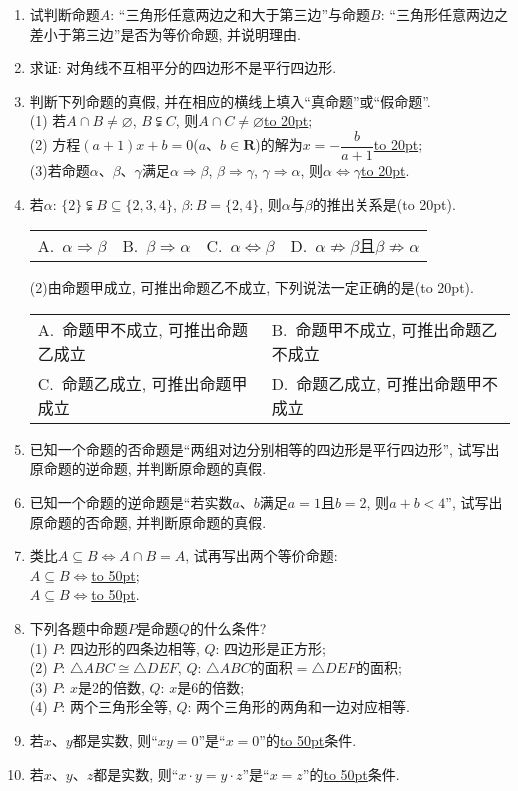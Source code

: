 \documentclass[10pt,a4paper]{article}
\newcommand{\blank}[1]{\underline{\hbox to #1pt{}}}
\newcommand{\bracket}[1]{(\hbox to #1pt{})}
\newcommand{\twoch}[4]{\par\begin{tabular}{p{.46\textwidth}p{.46\textwidth}}
A.~#1& B.~#2\\
C.~#3& D.~#4
\end{tabular}}
\newcommand{\fourch}[4]{\par\begin{tabular}{p{.23\textwidth}p{.23\textwidth}p{.23\textwidth}p{.23\textwidth}}
A.~#1 &B.~#2& C.~#3& D.~#4
\end{tabular}}
\begin{document}
\begin{enumerate}[1.]
\item 试判断命题$A$: ``三角形任意两边之和大于第三边''与命题$B$: ``三角形任意两边之差小于第三边''是否为等价命题, 并说明理由.
\item 求证: 对角线不互相平分的四边形不是平行四边形.
\item 判断下列命题的真假, 并在相应的横线上填入``真命题''或``假命题''.\\
(1) 若$A\cap B\ne \varnothing$, $B\subsetneqq C$, 则$A\cap C\ne \varnothing$\blank{20};\\
(2) 方程$(a+1)x+b=0$($a$、$b\in \mathbf{R}$)的解为$x=-\dfrac b{a+1}$\blank{20};\\
(3)若命题$\alpha$、$\beta$、$\gamma$满足$\alpha \Rightarrow \beta$, $\beta \Rightarrow \gamma$, $\gamma \Rightarrow \alpha$, 则$\alpha \Leftrightarrow \gamma$\blank{20}.
\item 若$\alpha$: $\{2\}\subsetneqq B\subseteq \{2,3,4\}$, $\beta :B=\{2,4\}$, 则$\alpha$与$\beta$的推出关系是\bracket{20}.
\fourch{$\alpha \Rightarrow \beta$}{$\beta \Rightarrow \alpha$}{$\alpha \Leftrightarrow \beta$}{$\alpha \not\Rightarrow \beta$且$\beta \not\Rightarrow \alpha$}
(2)由命题甲成立, 可推出命题乙不成立, 下列说法一定正确的是\bracket{20}.
\twoch{命题甲不成立, 可推出命题乙成立}{命题甲不成立, 可推出命题乙不成立}{命题乙成立, 可推出命题甲成立}{命题乙成立, 可推出命题甲不成立}
\item 已知一个命题的否命题是``两组对边分别相等的四边形是平行四边形'', 试写出原命题的逆命题, 并判断原命题的真假.
\item 已知一个命题的逆命题是``若实数$a$、$b$满足$a=1$且$b=2$, 则$a+b<4$'', 试写出原命题的否命题, 并判断原命题的真假.
\item 类比$A\subseteq B\Leftrightarrow A\cap B=A$, 试再写出两个等价命题:\\
$A\subseteq B\Leftrightarrow$\blank{50};\\
$A\subseteq B\Leftrightarrow$\blank{50}.
\item 下列各题中命题$P$是命题$Q$的什么条件?\\
(1) $P$: 四边形的四条边相等, $Q$: 四边形是正方形;\\
(2) $P$: $\triangle ABC\cong \triangle DEF$,	$Q$: $\triangle ABC$的面积$=\triangle DEF$的面积;\\
(3) $P$: $x$是2的倍数, $Q$: $x$是6的倍数;\\
(4) $P$: 两个三角形全等, $Q$: 两个三角形的两角和一边对应相等.
\item 若$x$、$y$都是实数, 则``$xy=0$''是``$x=0$''的\blank{50}条件.
\item 若$x$、$y$、$z$都是实数, 则``$x\cdot y=y\cdot z$''是``$x=z$''的\blank{50}条件.

\end{enumerate}
\end{document}
